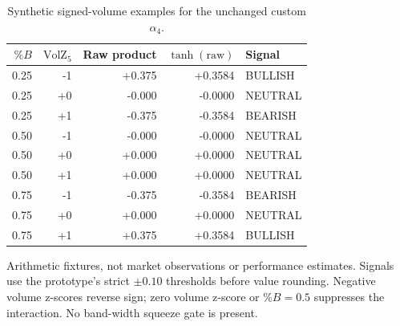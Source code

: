 \begin{table}[htbp]
\centering\small
\caption{Synthetic signed-volume examples for the unchanged custom $\alpha_4$.}
\label{tab:alpha4_signed_cases}
\begin{tabular}{rrrrl}\hline
$\%B$ & $\mathrm{VolZ}_5$ & Raw product & $\tanh(\mathrm{raw})$ & Signal \\\hline
0.25 & -1 & +0.375 & +0.3584 & BULLISH \\
0.25 & +0 & -0.000 & -0.0000 & NEUTRAL \\
0.25 & +1 & -0.375 & -0.3584 & BEARISH \\
0.50 & -1 & -0.000 & -0.0000 & NEUTRAL \\
0.50 & +0 & +0.000 & +0.0000 & NEUTRAL \\
0.50 & +1 & +0.000 & +0.0000 & NEUTRAL \\
0.75 & -1 & -0.375 & -0.3584 & BEARISH \\
0.75 & +0 & +0.000 & +0.0000 & NEUTRAL \\
0.75 & +1 & +0.375 & +0.3584 & BULLISH \\
\hline\end{tabular}
\par\smallskip\footnotesize Arithmetic fixtures, not market observations or performance estimates. Signals use the prototype's strict $\pm0.10$ thresholds before value rounding. Negative volume z-scores reverse sign; zero volume z-score or $\%B=0.5$ suppresses the interaction. No band-width squeeze gate is present.
\end{table}
